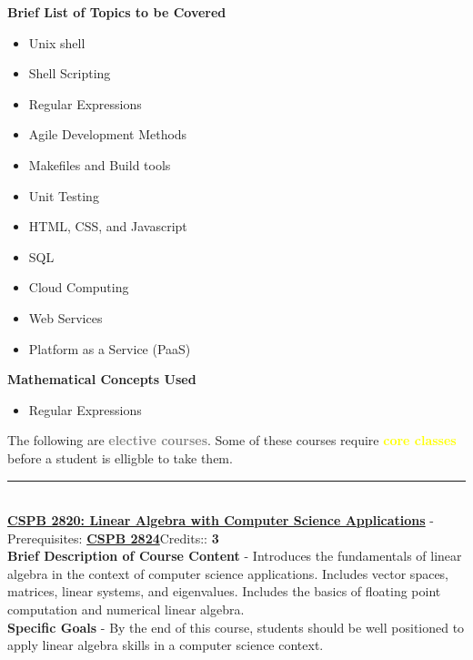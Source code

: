 \documentclass{article}
\newcommand{\horizontalline}{\noindent \rule{\textwidth}{0.5pt} \\}
\begin{document}
\noindent \textbf{Brief List of Topics to be Covered}
\begin{itemize}
    \item Unix shell
    \item Shell Scripting
    \item Regular Expressions
    \item Agile Development Methods
    \item Makefiles and Build tools
    \item Unit Testing
    \item HTML, CSS, and Javascript
    \item SQL
    \item Cloud Computing
    \item Web Services
    \item Platform as a Service (PaaS)
\end{itemize}

\noindent \textbf{Mathematical Concepts Used}
\begin{itemize}
    \item Regular Expressions
\end{itemize}

\noindent The following are \textcolor{gray}{\textbf{elective courses}}. Some of these courses require \textcolor{yellow}{\textbf{core classes}} before a student is elligble to take them.

\horizontalline
\noindent \href{https://www.colorado.edu/program/cspb/cspb-2820-–-linear-algebra-computer-science-applications}{\textbf{CSPB 2820: Linear Algebra with Computer Science Applications}} - Prerequisites: \href{https://www.colorado.edu/program/cspb/cspb-2824-discrete-structures}{\textbf{CSPB 2824}}Credits:: \textbf{3} \\

\noindent \textbf{Brief Description of Course Content} - Introduces the fundamentals of linear algebra in the context of computer science applications. Includes vector spaces, matrices, linear systems, and eigenvalues. Includes the basics of floating point computation and numerical linear algebra. \\

\noindent \textbf{Specific Goals} - By the end of this course, students should be well positioned to apply linear algebra skills in a computer science context. \\
\end{document}
